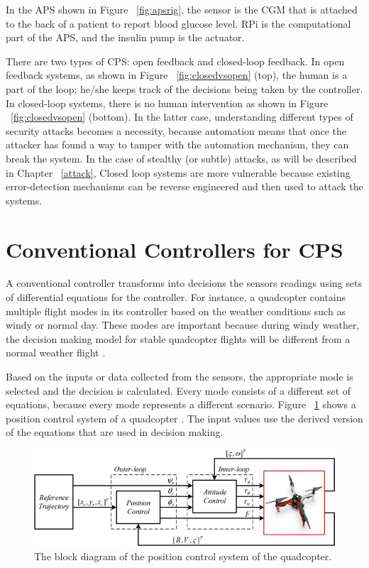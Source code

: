 In the \ac{APS} shown in Figure ~\ref{fig:apsrig}, the sensor is the \ac{CGM} that is attached to the back of a patient to report blood glucose level.  
\ac{RPi} is the computational part of the \ac{APS}, and the insulin pump is the actuator. 

There are two types of CPS: open feedback and closed-loop feedback.
In open feedback systems, 
as shown in Figure ~\ref{fig:closedvsopen} (top), the human is a part of the loop; he/she keeps track of the decisions being taken by the controller. 
In closed-loop systems, there is no human intervention 
as shown in Figure ~\ref{fig:closedvsopen} (bottom). 
In the latter case, understanding different types of security attacks becomes a necessity, because automation means that once the attacker has found a way to tamper with the automation mechanism, they can break the system. 
In the case of stealthy (or subtle) attacks, as will be described in Chapter ~\ref{attack}, 
Closed loop systems are more vulnerable because existing error-detection mechanisms can be reverse engineered and then used to attack the systems. 

\section{Conventional Controllers for CPS}

A conventional controller transforms into decisions the sensors readings using sets of differential equations for the controller. 
For instance, a quadcopter contains multiple flight modes in its controller based on the weather conditions such as windy or normal day. 
These modes are important because during windy weather, the decision making model for stable quadcopter flights will be different from a normal weather flight \cite{inbook}. 

Based on the inputs or data collected from the sensors, the appropriate  mode is selected and the decision is calculated. 
Every mode consists of a different set of equations, because every mode represents a different scenario.
Figure ~\ref{fig:controltheory} shows a position control system of a quadcopter \cite{inbook}. The input values use the derived version of the equations that are used in decision making. 

\begin{figure}
	\centering
	\includegraphics[width=0.7\linewidth]{Images/controltheory}
	\caption{The block diagram of the position control system of the quadcopter.
	}
	\label{fig:controltheory} 
\end{figure}


